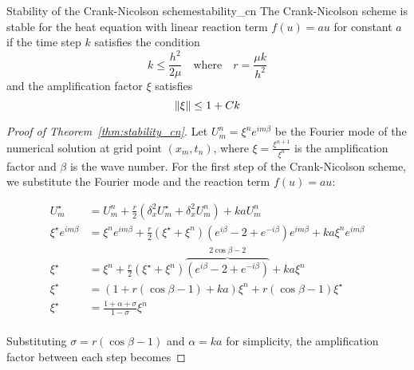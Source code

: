 \begin{theorem}{Stability of the Crank-Nicolson scheme}{stability_cn}
  The Crank-Nicolson scheme is stable for the heat equation with linear reaction term \(f(u) = au\) for constant \(a\) if the time step \(k\) satisfies the condition
  \[
    k \leq \frac{h^2}{2\mu} \quad \text{where} \quad r = \frac{\mu k}{h^2}
  \]
  and the amplification factor \(\xi\) satisfies
  \[
    \lVert\xi\rVert \leq 1 + Ck
  \]
\end{theorem}
\begin{proof}[Proof of Theorem~\ref{thm:stability_cn}]
  Let \(U_m^n = \xi^n e^{i m \beta}\) be the Fourier mode of the numerical solution at grid point \((x_m, t_n)\), where \(\xi=\frac{\xi^{n+1}}{\xi^n}\) is the amplification factor and \(\beta\) is the wave number.
  For the first step of the Crank-Nicolson scheme, we substitute the Fourier mode and the reaction term \(f(u) = au\):

  \begin{align*}
    U_m^\star               & = U_m^n + \frac{r}{2} (\delta_x^2 U_m^\star + \delta_x^2 U_m^n) + k a U_m^n                                                                     \\
    \xi^\star e^{i m \beta} & = \xi^n e^{i m \beta} + \frac{r}{2} \left(\xi^\star + \xi^n\right)\left(e^{i\beta} - 2 + e^{-i\beta}\right)e^{im\beta}+ k a \xi^n e^{i m \beta} \\
    \xi^\star               & = \xi^n + \frac{r}{2} \left(\xi^\star + \xi^n \right)\overbrace{\left(e^{i \beta} - 2 + e^{-i \beta}\right)}^{2\cos\beta - 2} + k a \xi^n       \\
    \xi^\star               & = (1 + r(\cos\beta - 1) + ka) \xi^n + r(\cos\beta - 1)\xi^\star                                                                                 \\
    \xi^\star               & = \frac{1 + \alpha + \sigma}{1 - \sigma} \xi^n                                                                                                  \\
  \end{align*}

  Substituting \(\sigma = r(\cos\beta - 1)\) and \(\alpha = ka\) for simplicity, the amplification factor between each step becomes


\end{proof}
